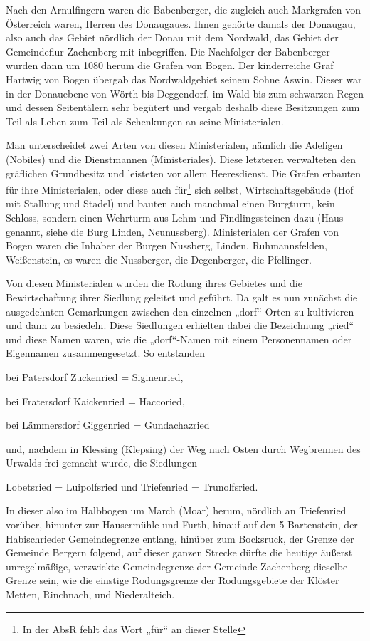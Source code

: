 \documentclass[12pt,a4pager,draft]{book}
\begin{document}
Nach den Arnulfingern waren die Babenberger, die zugleich auch Markgrafen von
Österreich waren, Herren des Donaugaues. Ihnen gehörte damals der Donaugau, also
auch das Gebiet nördlich der Donau mit dem Nordwald, das Gebiet der Gemeindeflur
Zachenberg mit inbegriffen. Die Nachfolger der Babenberger wurden dann um 1080
herum die Grafen von Bogen. Der kinderreiche Graf Hartwig von Bogen übergab das
Nordwaldgebiet seinem Sohne Aswin. Dieser war in der Donauebene von Wörth bis
Deggendorf, im Wald bis zum schwarzen Regen und dessen Seitentälern sehr
begütert und vergab deshalb diese Besitzungen zum Teil als Lehen zum Teil als
Schenkungen an seine Ministerialen.

Man unterscheidet zwei Arten von diesen Ministerialen, nämlich die Adeligen
(Nobiles) und die Dienstmannen (Ministeriales). Diese letzteren verwalteten den
gräflichen Grundbesitz und leisteten vor allem Heeresdienst. Die Grafen erbauten
für ihre Ministerialen, oder diese auch für\footnote{In der AbsR fehlt das Wort
„für“ an dieser Stelle} sich selbst, Wirtschaftsgebäude (Hof mit Stallung und
Stadel) und bauten auch manchmal einen Burgturm, kein Schloss, sondern einen
Wehrturm aus Lehm und Findlingssteinen dazu (Haus genannt, siehe die Burg
Linden, Neunussberg). Ministerialen der Grafen von Bogen waren die Inhaber der
Burgen Nussberg, Linden, Ruhmannsfelden, Weißenstein, es waren die Nussberger,
die Degenberger, die Pfellinger.

Von diesen Ministerialen wurden die Rodung ihres Gebietes und die
Bewirtschaftung ihrer Siedlung geleitet und geführt. Da galt es nun zunächst die
ausgedehnten Gemarkungen zwischen den einzelnen „dorf“-Orten zu kultivieren und
dann zu besiedeln. Diese Siedlungen erhielten dabei die Bezeichnung „ried“ und
diese Namen waren, wie die „dorf“-Namen mit einem Personennamen oder Eigennamen
zusammengesetzt. So entstanden

bei Patersdorf Zuckenried = Siginenried,

bei Fratersdorf Kaickenried = Haccoried,

bei Lämmersdorf Giggenried = Gundachazried

und, nachdem in Klessing (Klepsing) der Weg nach Osten durch Wegbrennen des
Urwalds frei gemacht wurde, die Siedlungen

Lobetsried = Luipolfsried und Triefenried = Trunolfsried.

In dieser also im Halbbogen um March (Moar) herum, nördlich an Triefenried
vorüber, hinunter zur Hausermühle und Furth, hinauf auf den 5 Bartenstein, der
Habischrieder Gemeindegrenze entlang, hinüber zum Bocksruck, der Grenze der
Gemeinde Bergern folgend, auf dieser ganzen Strecke dürfte die heutige äußerst
unregelmäßige, verzwickte Gemeindegrenze der Gemeinde Zachenberg dieselbe Grenze
sein, wie die einstige Rodungsgrenze der Rodungsgebiete der Klöster Metten,
Rinchnach, und Niederalteich.
\end{document}
